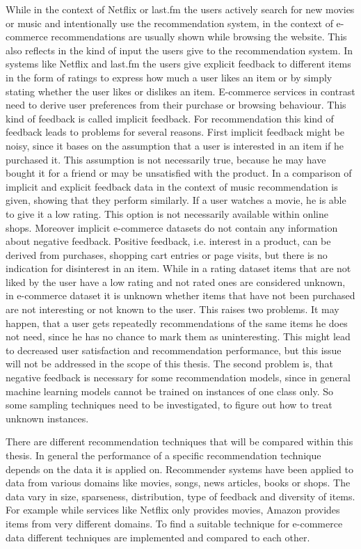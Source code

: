 \documentclass[10pt]{reportMaster}
\begin{document}
While in the context of Netflix or last.fm the users actively search for new movies or music and intentionally use the recommendation system, in the context of e-commerce recommendations are usually shown while browsing the website.
This also reflects in the kind of input the users give to the recommendation system.
In systems like Netflix  \cite{netflixPrize} and last.fm \cite{implExplComparisonLastfm} the users give explicit feedback to different items in the form of ratings to express how much a user likes an item or by simply stating whether the user likes or dislikes an item.
E-commerce services in contrast need to derive user preferences from their purchase or browsing behaviour.
This kind of feedback is called implicit feedback.
For recommendation this kind of feedback leads to problems for several reasons.
First implicit feedback might be noisy, since it bases on the assumption that a user is interested in an item if he purchased it.
This assumption is not necessarily true, because he may have bought it for a friend or may be unsatisfied with the product.
In \cite{implExplComparisonLastfm} a comparison of implicit and explicit feedback data in the context of music recommendation is given, showing that they perform similarly.
If a user watches a movie, he is able to give it a low rating.
This option is not necessarily available within online shops.
Moreover implicit e-commerce datasets do not contain any information about negative feedback.
Positive feedback, i.e. interest in a product, can be derived from purchases, shopping cart entries or page visits, but there is no indication for disinterest in an item.
While in a rating dataset items that are not liked by the user have a low rating and not rated ones are considered unknown, in e-commerce dataset it is unknown whether items that have not been purchased are not interesting or not known to the user.
This raises two problems.
It may happen, that a user gets repeatedly recommendations of the same items he does not need, since he has no chance to mark them as uninteresting.
This might lead to decreased user satisfaction and recommendation performance, but this issue will not be addressed in the scope of this thesis.
The second problem is, that negative feedback is necessary for some recommendation models, since in general machine learning models cannot be trained on instances of one class only.
So some sampling techniques need to be investigated, to figure out how to treat unknown instances.

There are different recommendation techniques that will be compared within this thesis.
In general the performance of a specific recommendation technique depends on the data it is applied on.
Recommender systems have been applied to data from various domains like movies, songs, news articles, books or shops.
The data vary in size, sparseness, distribution, type of feedback and diversity of items.
For example while services like Netflix only provides movies, Amazon provides items from very different domains.
To find a suitable technique for e-commerce data different techniques are implemented and compared to each other.
\end{document}
